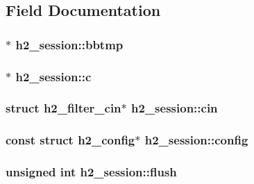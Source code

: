 \subsection{Field Documentation}
\subsubsection[{\texorpdfstring{bbtmp}{bbtmp}}]{$\ast$ h2\+\_\+session\+::bbtmp}\hypertarget{structh2__session_a12214fa117a9a29bec0cd4922b118363}{}\label{structh2__session_a12214fa117a9a29bec0cd4922b118363}
\subsubsection[{\texorpdfstring{c}{c}}]{$\ast$ h2\+\_\+session\+::c}\hypertarget{structh2__session_abeacbf3e093a3fc5d67609497c82daba}{}\label{structh2__session_abeacbf3e093a3fc5d67609497c82daba}
\subsubsection[{\texorpdfstring{cin}{cin}}]{\setlength{\rightskip}{0pt plus 5cm}struct {\bf h2\+\_\+filter\+\_\+cin}$\ast$ h2\+\_\+session\+::cin}\hypertarget{structh2__session_a769e774a574d53062823fe2d798e060f}{}\label{structh2__session_a769e774a574d53062823fe2d798e060f}
\subsubsection[{\texorpdfstring{config}{config}}]{\setlength{\rightskip}{0pt plus 5cm}const struct {\bf h2\+\_\+config}$\ast$ h2\+\_\+session\+::config}\hypertarget{structh2__session_a6a834c27d772bd80f1837723e3ef04b8}{}\label{structh2__session_a6a834c27d772bd80f1837723e3ef04b8}
\subsubsection[{\texorpdfstring{flush}{flush}}]{\setlength{\rightskip}{0pt plus 5cm}unsigned {\bf int} h2\+\_\+session\+::flush}\hypertarget{structh2__session_a8b69c69f54c8d00ed834802439a3c9ef}{}\label{structh2__session_a8b69c69f54c8d00ed834802439a3c9ef}
